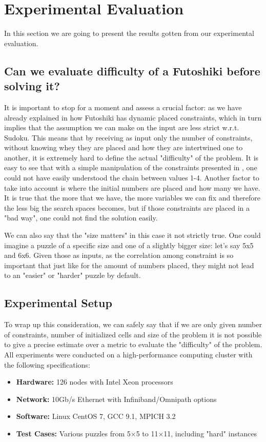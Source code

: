 \section{Experimental Evaluation}
\label{sec:evaluation}

In this section we are going to present the results gotten from our experimental evaluation.



\subsection{Can we evaluate difficulty of a Futoshiki before solving it?}
It is important to stop for a moment and assess a crucial factor: as we have already explained in  how Futoshiki has dynamic placed constraints, which in turn implies that the assumption we can make on the input are less strict w.r.t. Sudoku. This means that by receiving as input only the number of constraints, without knowing whey they are placed and how they are intertwined one to another, it is extremely hard to define the actual "difficulty" of the problem. It is easy to see that with a simple manipulation of the constraints presented in , one could not have easily understood the chain between values 1-4. Another factor to take into account is where the initial numbers are placed and how many we have. It is true that the more that we have, the more variables we can fix and therefore the less big the search spaces becomes, but if those constraints are placed in a "bad way", one could not find the solution easily.

We can also say that the "size matters" in this case it not strictly true. One could imagine a puzzle of a specific size and one of a slightly bigger size: let's say 5x5 and 6x6. Given those as inputs, as the correlation among constraint is so important that just like for the amount of numbers placed, they might not lead to an "easier" or "harder" puzzle by default.

\subsection{Experimental Setup}
To wrap up this consideration, we can safely say that if we are only given number of constraints, number of initialized cells and size of the problem it is not possible to give a precise estimate over a metric to evaluate the "difficulty" of the problem.
All experiments were conducted on a high-performance computing cluster with the following specifications:
\begin{itemize}
    \item \textbf{Hardware:} 126 nodes with Intel Xeon processors
    \item \textbf{Network:} 10Gb/s Ethernet with Infiniband/Omnipath options
    \item \textbf{Software:} Linux CentOS 7, GCC 9.1, MPICH 3.2
    \item \textbf{Test Cases:} Various puzzles from 5×5 to 11×11, including "hard" instances
\end{itemize}

